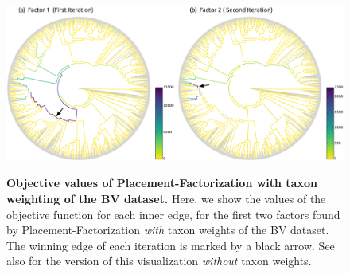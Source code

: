 \begin{figure}[btp!]
    \centering
    \includegraphics[width=\linewidth]{pdf/pf_bv_place_tw_ovs.pdf}
    \begin{subfigure}{0pt}
        \label{fig:pf_bv_place_tw_ovs:sub:first}
    \end{subfigure}
    \begin{subfigure}{0pt}
        \label{fig:pf_bv_place_tw_ovs:sub:second}
    \end{subfigure}
    \caption[Objective values of Placement-Factorization with taxon weighting of the \acs{BV} dataset]{
        \textbf{Objective values of Placement-Factorization with taxon weighting of the \ac{BV} dataset.}
        Here, we show the values of the objective function for each inner edge,
        for the first two factors found by Placement-Factorization \emph{with} taxon weights of the \ac{BV} dataset.
        The winning edge of each iteration is marked by a black arrow.
        See also  for the version of this visualization \emph{without} taxon weights.
    }
    \label{fig:pf_bv_place_tw_ovs}
\end{figure}

